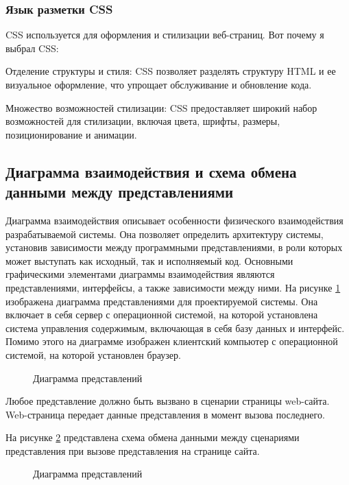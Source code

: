 \subsubsection{Язык разметки CSS}

CSS используется для оформления и стилизации веб-страниц. Вот почему я выбрал CSS:

Отделение структуры и стиля: CSS позволяет разделять структуру HTML и ее визуальное оформление, что упрощает обслуживание и обновление кода.

Множество возможностей стилизации: CSS предоставляет широкий набор возможностей для стилизации, включая цвета, шрифты, размеры, позиционирование и анимации.

\subsection{Диаграмма взаимодействия и схема обмена данными между представлениями}

Диаграмма взаимодействия описывает особенности физического взаимодействия разрабатываемой системы. Она позволяет определить архитектуру системы, установив зависимости между программными представлениями, в роли которых может выступать как исходный, так и исполняемый код. Основными графическими элементами диаграммы взаимодействия являются представлениями, интерфейсы, а также зависимости между ними. На рисунке \ref{comp:image} изображена диаграмма представлениями для проектируемой системы. Она включает в себя сервер с операционной системой, на которой установлена система управления содержимым, включающая в себя базу данных и интерфейс. Помимо этого на диаграмме изображен клиентский компьютер с операционной системой, на которой установлен браузер.

\begin{figure}[ht]
\caption{Диаграмма представлений}
\label{comp:image}
\end{figure}

Любое представление должно быть вызвано в сценарии страницы web-сайта. Web-страница передает данные представления в момент вызова последнего.

На рисунке \ref{data:image} представлена схема обмена данными между сценариями представления при вызове представления на странице сайта.

\begin{figure}[ht]
\caption{Диаграмма представлений}
\label{data:image}
\end{figure}

